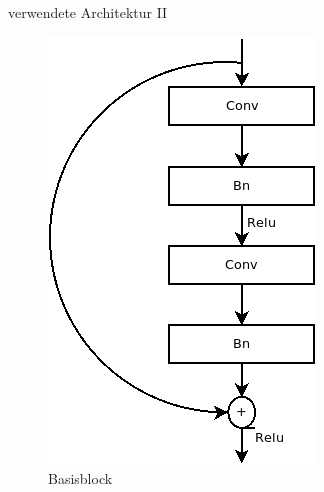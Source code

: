 \documentclass[10pt]{beamer}
\begin{document}
\begin{frame}{verwendete Architektur II}
\begin{figure}[]
   \begin{minipage}[b]{.4\linewidth} %
      \includegraphics[width=0.8\linewidth]{images/Basisblock.png}
      \caption{Basisblock}
   \end{minipage}
   \hspace{.1\linewidth}%
   \begin{minipage}[b]{.4\linewidth} %

\end{minipage}
\end{figure}
\end{frame}
\end{document}
